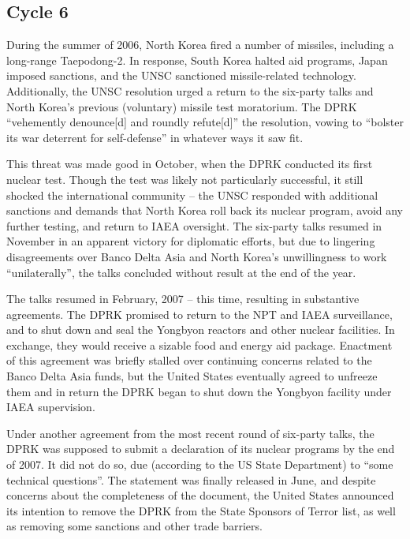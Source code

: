 \documentclass{article}
\begin{document}
\subsection{Cycle 6}

During the summer of 2006, North Korea fired a number of missiles, including a long-range Taepodong-2. In response, South Korea halted aid programs, Japan imposed sanctions, and the UNSC sanctioned missile-related technology\cite{greenlees}. Additionally, the UNSC resolution urged a return to the six-party talks and North Korea’s previous (voluntary) missile test moratorium\cite{unsc06}. The DPRK “vehemently denounce[d] and roundly refute[d]” the resolution, vowing to “bolster its war deterrent for self-defense” in whatever ways it saw fit\cite{kcna5}.

This threat was made good in October, when the DPRK conducted its first nuclear test\cite{nti15}. Though the test was likely not particularly successful, it still shocked the international community – the UNSC responded with additional sanctions and demands that North Korea roll back its nuclear program, avoid any further testing, and return to IAEA oversight\cite{unsc1718}. The six-party talks resumed in November in an apparent victory for diplomatic efforts, but due to lingering disagreements over Banco Delta Asia and North Korea’s unwillingness to work “unilaterally”, the talks concluded without result at the end of the year\cite{davenport}.

The talks resumed in February, 2007 – this time, resulting in substantive agreements. The DPRK promised to return to the NPT and IAEA surveillance, and to shut down and seal the Yongbyon reactors and other nuclear facilities. In exchange, they would receive a sizable food and energy aid package\cite{6pt07}. Enactment of this agreement was briefly stalled over continuing concerns related to the Banco Delta Asia funds, but the United States eventually agreed to unfreeze them and in return the DPRK began to shut down the Yongbyon facility under IAEA supervision\cite{davenport}.

Under another agreement from the most recent round of six-party talks, the DPRK was supposed to submit a declaration of its nuclear programs by the end of 2007\cite{6pt07pt2}. It did not do so, due (according to the US State Department) to “some technical questions”\cite{seanm}. The statement was finally released in June, and despite concerns about the completeness of the document, the United States announced its intention to remove the DPRK from the State Sponsors of Terror list, as well as removing some sanctions and other trade barriers\cite{nti15}.
\end{document}
